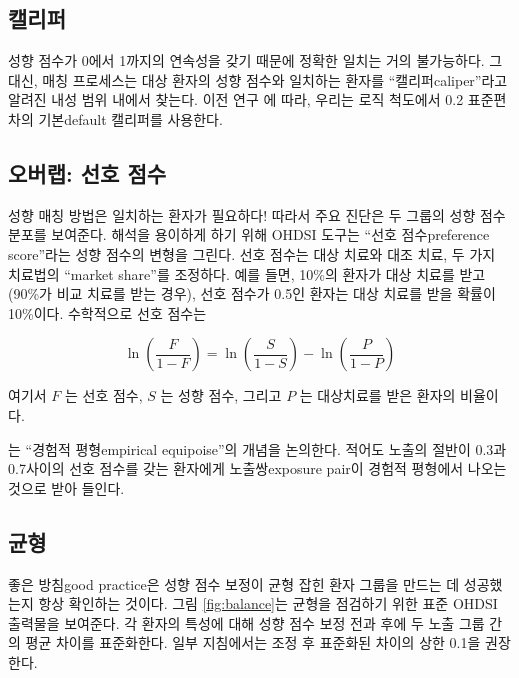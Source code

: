 \documentclass[10.5pt]{book}
\theoremstyle{definition}
\theoremstyle{definition}
\theoremstyle{definition}
\theoremstyle{remark}
\begin{document}
\subsection{캘리퍼}


성향 점수가 0에서 1까지의 연속성을 갖기 때문에 정확한 일치는 거의
불가능하다. 그 대신, 매칭 프로세스는 대상 환자의 성향 점수와 일치하는
환자를 ``캘리퍼caliper''라고 알려진 내성 범위 내에서 찾는다. 이전 연구
\citep{austin_2011} 에 따라, 우리는 로직 척도에서 0.2 표준편차의
기본default 캘리퍼를 사용한다.

\subsection{오버랩: 선호 점수}\label{--}


성향 매칭 방법은 일치하는 환자가 필요하다! 따라서 주요 진단은 두 그룹의
성향 점수 분포를 보여준다. 해석을 용이하게 하기 위해 OHDSI 도구는 ``선호
점수preference score''라는 성향 점수의 변형을 그린다.
\citep{walker_2013} 선호 점수는 대상 치료와 대조 치료, 두 가지 치료법의
``market share''를 조정하다. 예를 들면, 10\%의 환자가 대상 치료를 받고
(90\%가 비교 치료를 받는 경우), 선호 점수가 0.5인 환자는 대상 치료를
받을 확률이 10\%이다. 수학적으로 선호 점수는

\[\ln\left(\frac{F}{1-F}\right)=\ln\left(\frac{S}{1-S}\right)-\ln\left(\frac{P}{1-P}\right)\]

여기서 \(F\) 는 선호 점수, \(S\) 는 성향 점수, 그리고 \(P\) 는
대상치료를 받은 환자의 비율이다.

\citet{walker_2013} 는 ``경험적 평형empirical equipoise''의 개념을
논의한다. 적어도 노출의 절반이 0.3과 0.7사이의 선호 점수를 갖는 환자에게
노출쌍exposure pair이 경험적 평형에서 나오는 것으로 받아 들인다.

\subsection{균형}

 

좋은 방침good practice은 성향 점수 보정이 균형 잡힌 환자 그룹을 만드는
데 성공했는지 항상 확인하는 것이다. 그림 \ref{fig:balance}는 균형을
점검하기 위한 표준 OHDSI 출력물을 보여준다. 각 환자의 특성에 대해 성향
점수 보정 전과 후에 두 노출 그룹 간의 평균 차이를 표준화한다. 일부
지침에서는 조정 후 표준화된 차이의 상한 0.1을 권장한다.
\citep{rubin_2001}
\end{document}
